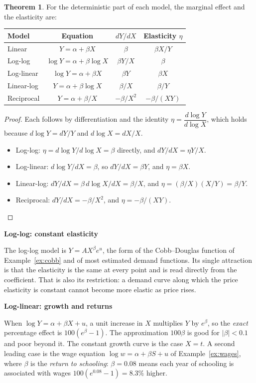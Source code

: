 \documentclass[11pt,a4paper]{article}
\numberwithin{equation}{section}
\theoremstyle{definition}
\newtheorem{thm}{Theorem}[subsection]
\newcommand{\subhead}[1]{%
  \par\medskip\noindent\textbf{#1}\par\nobreak\smallskip}
\begin{document}
\begin{thm}
\label{thm:forms}
For the deterministic part of each model, the marginal effect and the elasticity are:
\begin{center}
\renewcommand{\arraystretch}{1.6}
\begin{tabular}{lccc}
Model & Equation & $dY/dX$ & Elasticity $\eta$\\\hline
Linear & $Y = \alpha + \beta X$ & $\beta$ & $\beta X/Y$\\
Log-log & $\log Y = \alpha + \beta\log X$ & $\beta Y/X$ & $\beta$\\
Log-linear & $\log Y = \alpha + \beta X$ & $\beta Y$ & $\beta X$\\
Linear-log & $Y = \alpha + \beta\log X$ & $\beta/X$ & $\beta/Y$\\
Reciprocal & $Y = \alpha + \beta/X$ & $-\beta/X^2$ & $-\beta/(XY)$
\end{tabular}
\end{center}
\end{thm}

\begin{proof}
Each follows by differentiation and the identity $\eta = \dfrac{d\log Y}{d\log X}$, which holds because
$d\log Y = dY/Y$ and $d\log X = dX/X$.
\begin{itemize}
\item Log-log: $\eta = d\log Y/d\log X = \beta$ directly, and $dY/dX = \eta Y/X$.
\item Log-linear: $d\log Y/dX = \beta$, so $dY/dX = \beta Y$, and $\eta = \beta X$.
\item Linear-log: $dY/dX = \beta\, d\log X/dX = \beta/X$, and $\eta = (\beta/X)(X/Y) = \beta/Y$.
\item Reciprocal: $dY/dX = -\beta/X^2$, and $\eta = -\beta/(XY)$. \qedhere
\end{itemize}
\end{proof}

\subhead{Log-log: constant elasticity}
The log-log model is $Y = AX^{\beta}e^{u}$, the form of the Cobb--Douglas function of Example~\ref{ex:cobb} and of most estimated demand
functions. Its single attraction is that the elasticity is the same at every point and is read directly from the coefficient. That is also its
restriction: a demand curve along which the price elasticity is constant cannot become more elastic as price rises.

\subhead{Log-linear: growth and returns}
When $\log Y = \alpha + \beta X + u$, a unit increase in $X$ multiplies $Y$ by $e^{\beta}$, so the \emph{exact} percentage effect is
$100(e^{\beta} - 1)$. The approximation $100\beta$ is good for $|\beta| < 0.1$ and poor beyond it. The constant growth curve is the case $X = t$. A
second leading case is the wage equation $\log w = \alpha + \beta S + u$ of Example~\ref{ex:wages}, where $\beta$ is the \emph{return to schooling}:
$\beta = 0.08$ means each year of schooling is associated with wages $100(e^{0.08} - 1) = 8.3\%$ higher.
\end{document}
